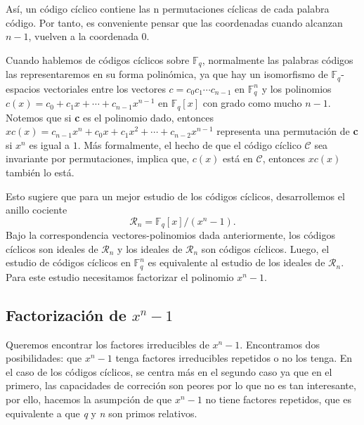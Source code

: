  Así, un código cíclico contiene las n permutaciones cíclicas de cada palabra código. Por tanto, es conveniente pensar que las coordenadas cuando alcanzan $n-1$, vuelven a la coordenada $0$.

Cuando hablemos de códigos cíclicos sobre $\mathbb{F}_q$, normalmente las palabras códigos las representaremos en su forma polinómica, ya que hay un isomorfismo de $\mathbb{F}_q$-espacios vectoriales entre los vectores $c = c_0c_1\cdots c_{n-1}$ en $\mathbb{F}_q^n$ y los polinomios $c(x)=c_0+c_1x+\cdots+c_{n-1}x^{n-1}$ en $\mathbb{F}_q[x]$ con grado como mucho $n-1$. Notemos que si \textbf{c} es el polinomio dado, entonces $xc(x)=c_{n-1}x^{n}+c_0x+c_1x^2+\cdots+c_{n-2}x^{n-1}$ representa una permutación de \textbf{c} si $x^n$ es igual a $1$. Más formalmente, el hecho de que el código cíclico $\mathcal{C}$ sea invariante por permutaciones, implica que, $c(x)$ está en $\mathcal{C}$, entonces $xc(x)$ también lo está. 

Esto sugiere que para un mejor estudio de los códigos cíclicos, desarrollemos el anillo cociente \[ \mathcal{R}_n =\mathbb{F}_q[x] / (x^n-1).\] Bajo la correspondencia vectores-polinomios dada anteriormente, los códigos cíclicos son ideales de $\mathcal{R}_n$ y los ideales de $\mathcal{R}_n$ son códigos cíclicos. Luego, el estudio de códigos cíclicos en $\mathbb{F}_q^n$ es equivalente al estudio de los ideales de $\mathcal{R}_n$. Para este estudio necesitamos factorizar el polinomio $x^n-1$.

\subsection{Factorización de $x^n-1$ }
Queremos encontrar los factores irreducibles de $x^n-1$. Encontramos dos posibilidades: que $x^n-1$ tenga factores irreducibles repetidos o no los tenga. En el caso de los códigos cíclicos, se centra más en el segundo caso ya que en el primero, las capacidades de correción son peores por lo que no es tan interesante, por ello, hacemos la asumpción de que $x^n-1$ no tiene factores repetidos, que es equivalente a que \textit{q} y \textit{n} son primos relativos.

